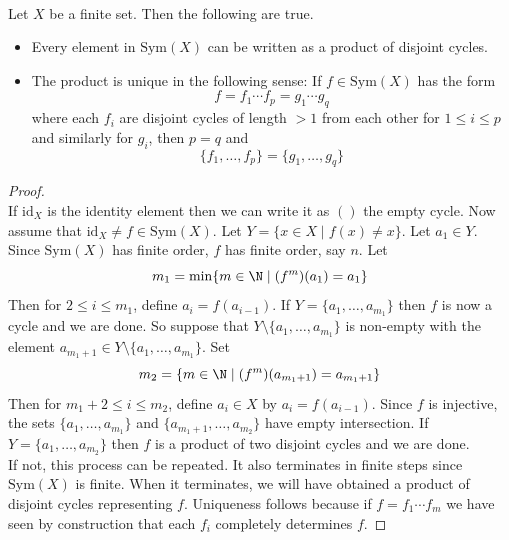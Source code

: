 \documentclass[a4paper]{article}
\begin{document}
\begin{prp}{}{}\\
Let $X$ be a finite set. Then the following are true. 
\begin{itemize}
\item Every element in $\text{Sym}(X)$ can be written as a product of disjoint cycles. 
\item The product is unique in the following sense: If $f\in\text{Sym}(X)$ has the form $$f=f_1\cdots f_p=g_1\cdots g_q$$ where each $f_i$ are disjoint cycles of length $>1$ from each other for $1\leq i\leq p$ and similarly for $g_i$, then $p=q$ and $$\{f_1,\dots,f_p\}=\{g_1,\dots,g_q\}$$
\end{itemize}
\begin{proof}\\
If $\text{id}_X$ is the identity element then we can write it as $()$ the empty cycle. Now assume that $\text{id}_X\neq f\in\text{Sym}(X)$. Let $Y=\{x\in X\;|\;f(x)\neq x\}$. Let $a_1\in Y$. Since $\text{Sym}(X)$ has finite order, $f$ has finite order, say $n$. Let $$m_1=\min\{m\in\N\;|\;(f^m)(a_1)=a_1\}$$ Then for $2\leq i\leq m_1$, define $a_i=f(a_{i-1})$. If $Y=\{a_1,\dots,a_{m_1}\}$ then $f$ is now a cycle and we are done. So suppose that $Y\setminus\{a_1,\dots,a_{m_1}\}$ is non-empty with the element $a_{m_1+1}\in Y\setminus\{a_1,\dots,a_{m_1}\}$. Set $$m_2=\{m\in\N\;|\;(f^m)(a_{m_1+1})=a_{m_1+1}\}$$ Then for $m_1+2\leq i\leq m_2$, define $a_i\in X$ by $a_i=f(a_{i-1})$. Since $f$ is injective, the sets $\{a_1,\dots,a_{m_1}\}$ and $\{a_{m_1+1},\dots,a_{m_2}\}$ have empty intersection. If $Y=\{a_1,\dots,a_{m_2}\}$ then $f$ is a product of two disjoint cycles and we are done. \\

If not, this process can be repeated. It also terminates in finite steps since $\text{Sym}(X)$ is finite. When it terminates, we will have obtained a product of disjoint cycles representing $f$. Uniqueness follows because if $f=f_1\cdots f_m$ we have seen by construction that each $f_i$ completely determines $f$. 
\end{proof}
\end{prp}
\end{document}
